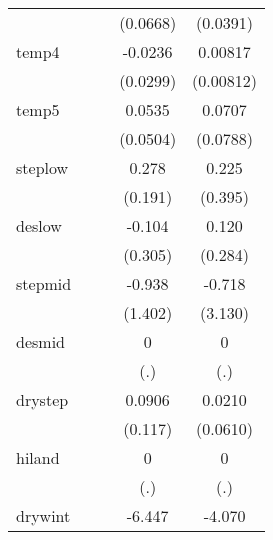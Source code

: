 {\begin{tabular}{l*{4}{c}}
            &                     &                     &    (0.0668)         &    (0.0391)         \\
[1em]
temp4       &                     &                     &     -0.0236         &     0.00817         \\
            &                     &                     &    (0.0299)         &   (0.00812)         \\
[1em]
temp5       &                     &                     &      0.0535         &      0.0707         \\
            &                     &                     &    (0.0504)         &    (0.0788)         \\
[1em]
steplow     &                     &                     &       0.278         &       0.225         \\
            &                     &                     &     (0.191)         &     (0.395)         \\
[1em]
deslow      &                     &                     &      -0.104         &       0.120         \\
            &                     &                     &     (0.305)         &     (0.284)         \\
[1em]
stepmid     &                     &                     &      -0.938         &      -0.718         \\
            &                     &                     &     (1.402)         &     (3.130)         \\
[1em]
desmid      &                     &                     &           0         &           0         \\
            &                     &                     &         (.)         &         (.)         \\
[1em]
drystep     &                     &                     &      0.0906         &      0.0210         \\
            &                     &                     &     (0.117)         &    (0.0610)         \\
[1em]
hiland      &                     &                     &           0         &           0         \\
            &                     &                     &         (.)         &         (.)         \\
[1em]
drywint     &                     &                     &      -6.447         &      -4.070         \\

\end{tabular}}
